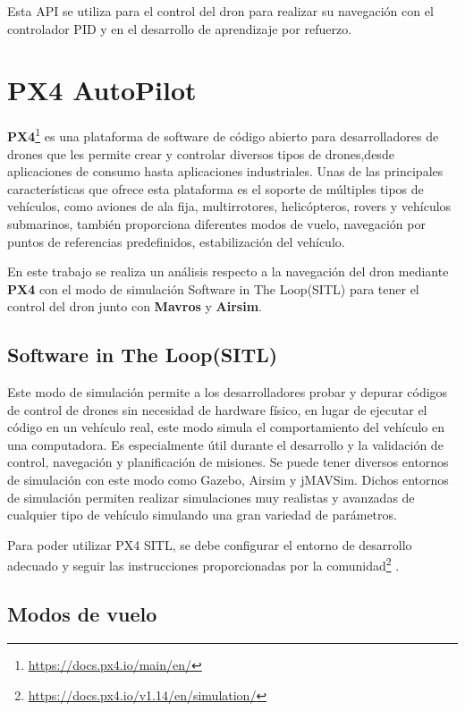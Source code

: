 Esta API se utiliza para el control del dron para realizar su navegación con el controlador PID y en 
el desarrollo de aprendizaje por refuerzo. 

\section{PX4 AutoPilot}
\label{sec:px4}

\textbf{PX4}\footnote{\url{https://docs.px4.io/main/en/}} es una plataforma de software de código abierto para desarrolladores de drones que les permite crear 
y controlar diversos tipos de drones,desde aplicaciones de consumo hasta aplicaciones industriales.
Unas de las principales características que ofrece esta plataforma es el soporte de múltiples tipos de vehículos, como aviones de 
ala fija, multirrotores, helicópteros, rovers y vehículos submarinos, también proporciona diferentes modos de vuelo, 
navegación por puntos de referencias predefinidos, estabilización del vehículo. 

En este trabajo se realiza un análisis respecto a la navegación del dron mediante \textbf{PX4} con el modo de simulación Software in The Loop(SITL) para tener el control del dron junto con 
\textbf{Mavros} y \textbf{Airsim}.
\subsection{Software in The Loop(SITL)}
\label{sec:px4 sitl} 
Este modo de simulación permite a los desarrolladores probar y depurar códigos de control de drones sin necesidad de hardware físico, en lugar de ejecutar el código en un 
vehículo real, este modo simula el comportamiento del vehículo en una computadora. Es especialmente útil durante el desarrollo y la validación de control, navegación y 
planificación de misiones.
Se puede tener diversos entornos de simulación con este modo como Gazebo, Airsim y jMAVSim. Dichos entornos de simulación permiten realizar simulaciones muy realistas y avanzadas 
de cualquier tipo de vehículo simulando una gran variedad de parámetros.

Para poder utilizar PX4 SITL, se debe configurar el entorno de desarrollo adecuado y seguir las instrucciones proporcionadas por la comunidad\footnote{\url{https://docs.px4.io/v1.14/en/simulation/}} .

\subsection{Modos de vuelo}
\label{sec:flight modes} 

